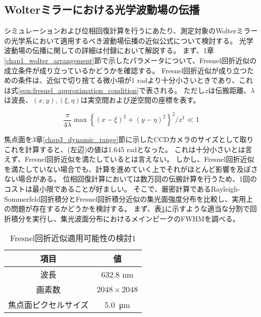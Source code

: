 \subsection{Wolterミラーにおける光学波動場の伝播}
\label{chap3_wolter_diffraction_apporoximation}
シミュレーションおよび位相回復計算を行うにあたり、測定対象のWolterミラーの光学系において適用するべき波動場伝播の近似公式について検討する。
光学波動場の伝播に関しての詳細は付録において解説する。
まず、1章\ref{chap1_wolter_arrangement}節で示したパラメータについて、Fresnel回折近似の成立条件が成り立っているかどうかを確認する。
Fresnel回折近似が成り立つための条件は、近似で切り捨てる微小項が1 radより十分小さいときであり、これは式\ref{eqn:fresnel_approximation_condition}で表される。
ただし$z$は伝搬距離、$\lambda$は波長、$(x, y), (\xi, \eta)$は実空間および逆空間の座標を表す。

\begin{equation}
\label{eqn:fresnel_approximation_condition}
    \frac{\pi}{4\lambda} \max \left\{ (x-\xi)^2 + (y-\eta)^2 \right\}^2 / z^3 \ll 1
\end{equation}

焦点面を3章\ref{chap3_dynamic_range}節に示したCCDカメラのサイズとして取りこれを計算すると、(左辺)の値は1.645 radとなった。
これは十分小さいとは言えず、Fresnel回折近似を満たしているとは言えない。
しかし、Fresnel回折近似を満たしていない場合でも、計算を進めていく上でそれがほとんど影響を及ぼさない場合がある。
位相回復計算においては数万回の伝搬計算を行うため、1回のコストは最小限であることが好ましい。
そこで、厳密計算であるRayleigh-Sommerfeld回折積分とFresnel回折積分近似の集光面強度分布を比較し、実用上の問題が存在するかどうかを検討する。
まず、表\ref{tb:check_approximation_validity_1}に示すような適当な分割で回折積分を実行し、集光波面分布におけるメインピークのFWHMを調べる。

\begin{table}[!ht]
\begin{center}
  \begin{tabular}{|c|c|} \hline
    項目 & 値 \\ \hline
    波長 & 632.8 nm \\
    画素数 & $2048 \times 2048$ \\
    焦点面ピクセルサイズ & \SI{5.0}{\micro \metre} \\ \hline
  \end{tabular}
  \caption{Fresnel回折近似適用可能性の検討1}
  \label{tb:check_approximation_validity_1}
\end{center}
\end{table}

